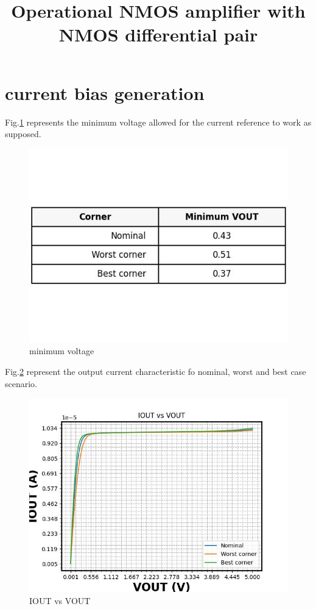 \documentclass{article}
\begin{document}
\title{Operational NMOS amplifier with NMOS differential pair}
\maketitle

\section{current bias generation}

Fig.\ref{fig:values} represents the minimum voltage allowed for the current reference to work as supposed.

\begin{figure}[H] %
    \centering
    \includegraphics[width=.7\textwidth]{./interception_table.jpg} %
    \caption{minimum voltage}
    \label{fig:values}
\end{figure}




Fig.\ref{fig:iout_vs_vout} represent the output current characteristic fo nominal, worst and best case scenario.

\begin{figure}[H] %
    \centering
    \includegraphics[width=.7\textwidth]{./IOUT_vs_VOUT.jpg} %
    \caption{IOUT vs VOUT}
    \label{fig:iout_vs_vout}
\end{figure}
\end{document}
